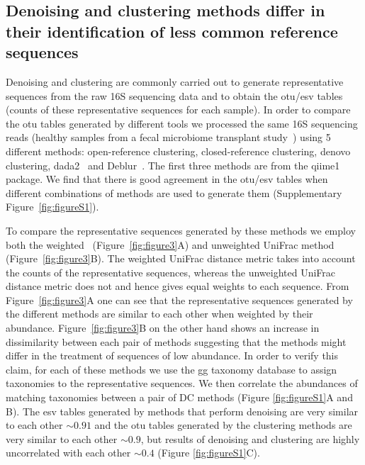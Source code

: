   \FloatBarrier

  \subsection*{Denoising and clustering methods differ in their identification of less common reference sequences}

  Denoising and clustering are commonly carried out to generate representative sequences from the raw 16S sequencing data and to obtain the \ac{otu}/\ac{esv} tables (counts of these representative sequences for each sample).
  In order to compare the \ac{otu} tables generated by different tools we processed the same 16S sequencing reads (healthy samples from a fecal microbiome transplant study~\cite{Kang2017}) using 5 different methods:  open-reference clustering, closed-reference clustering, denovo clustering, \ac{dada2}~\cite{Callahan2016} and Deblur~\cite{Amir2017}.
  The first three methods are from the \ac{qiime1}~\cite{Caporaso2010} package.
  We find that there is good agreement in the \ac{otu}/\ac{esv} tables when different combinations of methods are used to generate them (Supplementary Figure~\ref{fig:figureS1}).

  To compare the representative sequences generated by these methods we employ both the weighted~\cite{Lozupone2007} (Figure~\ref{fig:figure3}A) and unweighted UniFrac method~\cite{Lozupone2005} (Figure~\ref{fig:figure3}B).
  The weighted UniFrac distance metric takes into account the counts of the representative sequences, whereas the unweighted UniFrac distance metric does not and hence gives equal weights to each sequence.
  From Figure~\ref{fig:figure3}A one can see that the representative sequences generated by the different methods are similar to each other when weighted by their abundance.
  Figure~\ref{fig:figure3}B on the other hand shows an increase in dissimilarity between each pair of methods suggesting that the methods might differ in the treatment of sequences of low abundance.
  In order to verify this claim, for each of these methods we use the \ac{gg} taxonomy database to assign taxonomies to the representative sequences.
  We then correlate the abundances of matching taxonomies between a pair of DC methods (Figure \ref{fig:figureS1}A and B).
  The \ac{esv} tables generated by methods that perform denoising are very similar to each other $\sim0.91$ and the \ac{otu} tables generated by the clustering methods are very similar to each other $\sim0.9$, but results of denoising and clustering are highly uncorrelated with each other $\sim0.4$ (Figure \ref{fig:figureS1}C).

